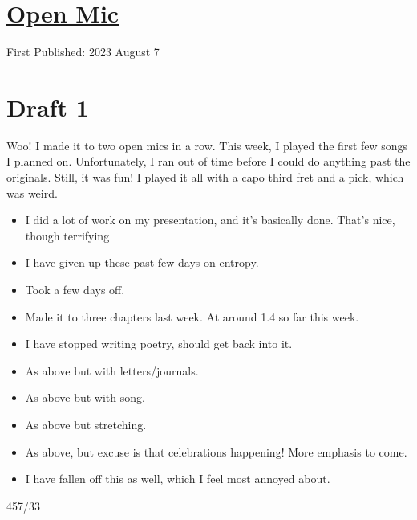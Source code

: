 \documentclass[12pt]{article}[titlepage]
\newcommand{\1}{\={a}}
\newcommand{\2}{\={e}}
\newcommand{\3}{\={\i}}
\newcommand{\4}{\=o}
\newcommand{\5}{\=u}
\newcommand{\6}{\={A}}
\renewcommand{\,}{\textsuperscript{,}}
\begin{document}
\doublespacing
\section{\href{open-mic-8.html}{Open Mic}}
First Published: 2023 August 7

\section{Draft 1}
Woo! I made it to two open mics in a row.
This week, I played the first few songs I planned on.
Unfortunately, I ran out of time before I could do anything past the originals.
Still, it was fun!
I played it all with a capo third fret and a pick, which was weird.

\begin{itemize}
\item I did a lot of work on my presentation, and it's basically done. That's nice, though terrifying
\item I have given up these past few days on entropy. 
\item Took a few days off.
\item Made it to three chapters last week. At around 1.4 so far this week.
\item I have stopped writing poetry, should get back into it.
\item As above but with letters/journals.
\item As above but with song.
\item As above but stretching.
\item As above, but excuse is that celebrations happening! More emphasis to come.
\item I have fallen off this as well, which I feel most annoyed about.
\end{itemize}
457/33
\end{document}
